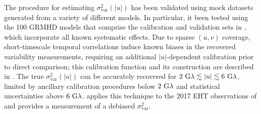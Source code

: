 The procedure for estimating $\sigma_\text{var}^2 (|u|)$ has been validated using mock datasets generated from a variety of different models.  In particular, it been tested using the 100 GRMHD models that comprise the calibration and validation sets in , which incorporate all known systematic effects.  Due to sparse $(u,v)$ coverage, short-timescale temporal correlations induce known biases in the recovered variability measurements, requiring an additional $|u|$-dependent calibration prior to direct comparison; this calibration function and its construction are described in \citealt{NoiseModeling}.  The true $\sigma_\text{var}^2 (|u|)$ can be accurately recovered for $2~{\rm G}\lambda\lesssim|u|\lesssim6~{\rm G}\lambda$, limited by ancillary calibration procedures below $2~{\rm G}\lambda$ and statistical uncertainties above $6~{\rm G}\lambda$.   applies this technique to the 2017 EHT observations of \sgra and provides a measurement of a debiased $\sigma_\text{var}^2$.



